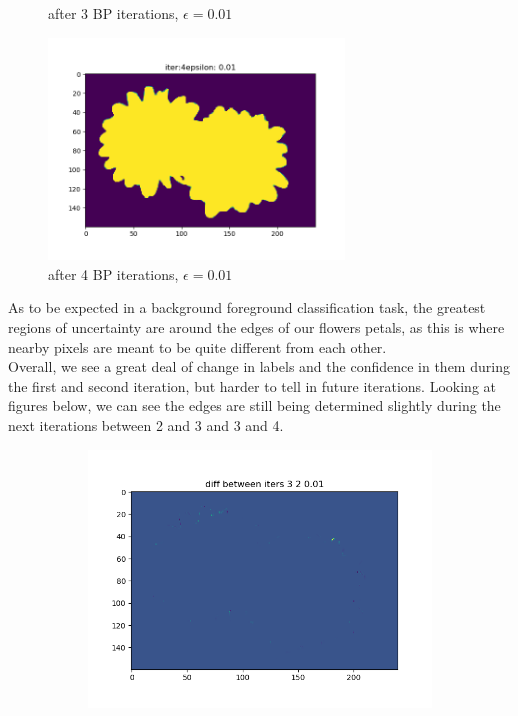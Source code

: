 \documentclass[12pt]{article}
\begin{document}
\begin{section}{4.6}
\begin{figure}[H]
		\caption{after 3 BP iterations, $\epsilon = 0.01$}
	\end{figure}
		\begin{figure}[H]
		\includegraphics[width=0.7\textwidth]{iter4_0_01.png}
		\caption{after 4 BP iterations, $\epsilon = 0.01$}
	\end{figure}
As to be expected in a background foreground classification task, the greatest regions of uncertainty are around the edges of our flowers petals, as this is where nearby pixels are meant to be quite different from each other. 
\\
Overall, we see a great deal of change in labels and the confidence in them during the first and second iteration, but harder to tell in future iterations. Looking at figures below, we can see the edges are still being determined slightly during the next iterations between 2 and 3 and 3 and 4.
\begin{figure}[H]
	\centering
	\begin{subfigure}{.5\textwidth}
		\centering
		\includegraphics[width=.8\linewidth]{32diff.png}
		\label{23diff}
	\end{subfigure}%

\end{figure}
\end{section}
\end{document}
